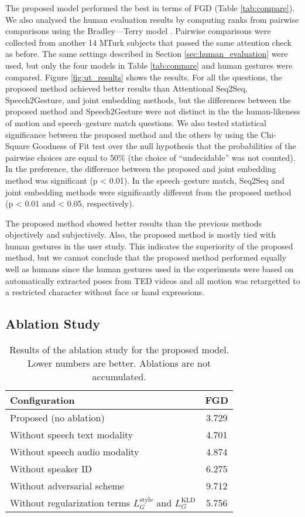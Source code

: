 \documentclass[acmtog]{acmart}
\begin{document}
The proposed model performed the best in terms of FGD (Table \ref{tab:compare}). We also analysed the human evaluation results by computing ranks from pairwise comparisons using the Bradley---Terry model \cite{chu2005extensions}. Pairwise comparisons were collected from another 14 MTurk subjects that passed the same attention check as before. The same settings described in Section \ref{sec:human_evaluation} were used, but only the four models in Table \ref{tab:compare} and human gestures were compared. Figure \ref{fig:ut_results} shows the results. For all the questions, the proposed method achieved better results than Attentional Seq2Seq, Speech2Gesture, and joint embedding methods, but the differences between the proposed method and Speech2Gesture were not distinct in the the human-likeness of motion and speech--gesture match questions. We also tested statistical significance between the proposed method and the others by using the Chi-Square Goodness of Fit test over the null hypothesis that the probabilities of the pairwise choices are equal to 50\% (the choice of ``undecidable'' was not counted). In the preference, the difference between the proposed and joint embedding method was significant (p < 0.01). In the speech--gesture match, Seq2Seq and joint embedding methods were significantly different from the proposed method (p < 0.01 and < 0.05, respectively).

The proposed method showed better results than the previous methods objectively and subjectively. Also, the proposed method is mostly tied with human gestures in the user study. This indicates the superiority of the proposed method, but we cannot conclude that the proposed method performed equally well as humans since the human gestures used in the experiments were based on automatically extracted poses from TED videos and all motion was retargetted to a restricted character without face or hand expressions.

\subsection{Ablation Study}

\begin{table}
\caption{Results of the ablation study for the proposed model. Lower numbers are better. Ablations are not accumulated.}
\label{tab:ablation}
\centering
\begin{tabularx}{\linewidth}{Xc}
  \toprule
  Configuration & FGD\\ 
  \midrule
Proposed (no ablation) & 3.729\\
Without speech text modality & 4.701\\
Without speech audio modality & 4.874\\
Without speaker ID & 6.275\\
Without adversarial scheme & 9.712\\
Without regularization terms $L_G^\textrm{style}$ and $L_G^\textrm{KLD}$ & 5.756\\
  \bottomrule
\end{tabularx}
\end{table}
\end{document}
